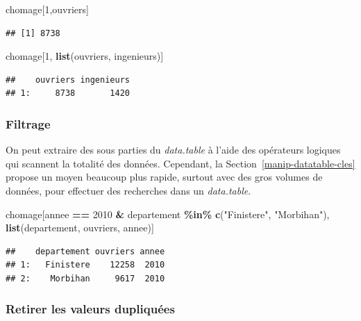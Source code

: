 \documentclass[
  11pt,
]{book}
\newenvironment{Shaded}{\begin{snugshade}}{\end{snugshade}}
\newcommand{\DecValTok}[1]{\textcolor[rgb]{0.00,0.00,0.81}{#1}}
\newcommand{\KeywordTok}[1]{\textcolor[rgb]{0.13,0.29,0.53}{\textbf{#1}}}
\newcommand{\NormalTok}[1]{#1}
\newcommand{\OperatorTok}[1]{\textcolor[rgb]{0.81,0.36,0.00}{\textbf{#1}}}
\newcommand{\StringTok}[1]{\textcolor[rgb]{0.31,0.60,0.02}{#1}}
\numberwithin{equation}{section}
\numberwithin{countremarque}{section}
\begin{document}
\begin{Shaded}
\begin{Highlighting}[]
\NormalTok{chomage[}\DecValTok{1}\NormalTok{,ouvriers]}
\end{Highlighting}
\end{Shaded}

\begin{lstlisting}
## [1] 8738
\end{lstlisting}

\begin{Shaded}
\begin{Highlighting}[]
\NormalTok{chomage[}\DecValTok{1}\NormalTok{, }\KeywordTok{list}\NormalTok{(ouvriers, ingenieurs)]}
\end{Highlighting}
\end{Shaded}

\begin{lstlisting}
##    ouvriers ingenieurs
## 1:     8738       1420
\end{lstlisting}

\hypertarget{filtrage-1}{%
\subsubsection{Filtrage}\label{filtrage-1}}

On peut extraire des sous parties du \emph{data.table} à l'aide des opérateurs logiques qui scannent la totalité des données. Cependant, la Section~\ref{manip-datatable-cles} propose un moyen beaucoup plus rapide, surtout avec des gros volumes de données, pour effectuer des recherches dans un \emph{data.table}.

\begin{Shaded}
\begin{Highlighting}[]
\NormalTok{chomage[annee }\OperatorTok{==}\StringTok{ }\DecValTok{2010} \OperatorTok{\&}\StringTok{ }\NormalTok{departement }\OperatorTok{\%in\%}\StringTok{ }\KeywordTok{c}\NormalTok{(}\StringTok{"Finistere"}\NormalTok{, }\StringTok{"Morbihan"}\NormalTok{),}
        \KeywordTok{list}\NormalTok{(departement, ouvriers, annee)]}
\end{Highlighting}
\end{Shaded}

\begin{lstlisting}
##    departement ouvriers annee
## 1:   Finistere    12258  2010
## 2:    Morbihan     9617  2010
\end{lstlisting}

\hypertarget{retirer-les-valeurs-dupliquuxe9es-1}{%
\subsubsection{Retirer les valeurs dupliquées}\label{retirer-les-valeurs-dupliquuxe9es-1}}
\end{document}
